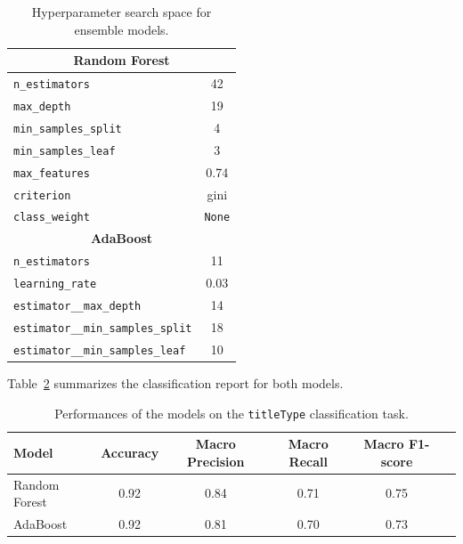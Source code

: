 \begin{table}[H]
\begin{minipage}{0.55\textwidth}
    \end{minipage}
    \hfill
    \begin{minipage}{0.4\textwidth}
        \centering
        \begin{tabular}{lc}
        \hline
        \multicolumn{2}{c}{\textbf{Random Forest}} \\
        \hline
        \texttt{n\_estimators} & 42 \\
        \texttt{max\_depth} & 19 \\
        \texttt{min\_samples\_split} & 4 \\
        \texttt{min\_samples\_leaf} & 3 \\
        \texttt{max\_features} & 0.74 \\
        \texttt{criterion} & gini \\
        \texttt{class\_weight} & \texttt{None} \\
        \hline
        \multicolumn{2}{c}{\textbf{AdaBoost}} \\
        \hline
        \texttt{n\_estimators} & 11 \\
        \texttt{learning\_rate} & 0.03 \\
        \texttt{estimator\_\_max\_depth} & 14 \\
        \texttt{estimator\_\_min\_samples\_split} & 18 \\
        \texttt{estimator\_\_min\_samples\_leaf} & 10 \\
        \hline
        \end{tabular}
        \caption{Hyperparameter search space for ensemble models.}
        \label{tab:ensemble_param_titletype}
    \end{minipage}
    
\end{table}

Table~\ref{tab:classification_report} summarizes the classification report for both models.
\begin{table}[H]
    \centering
    \begin{tabular}{lccccc}
    \hline
    \textbf{Model} & \textbf{Accuracy} & \textbf{Macro Precision} & \textbf{Macro Recall} & \textbf{Macro F1-score} \\
    \hline
    Random Forest & 0.92 & 0.84 & 0.71 & 0.75 \\
    AdaBoost & 0.92 & 0.81 & 0.70 & 0.73 \\
    \hline
    \end{tabular}
    \caption{Performances of the models on the \texttt{titleType} classification task.}
    \label{tab:classification_report}
\end{table}


